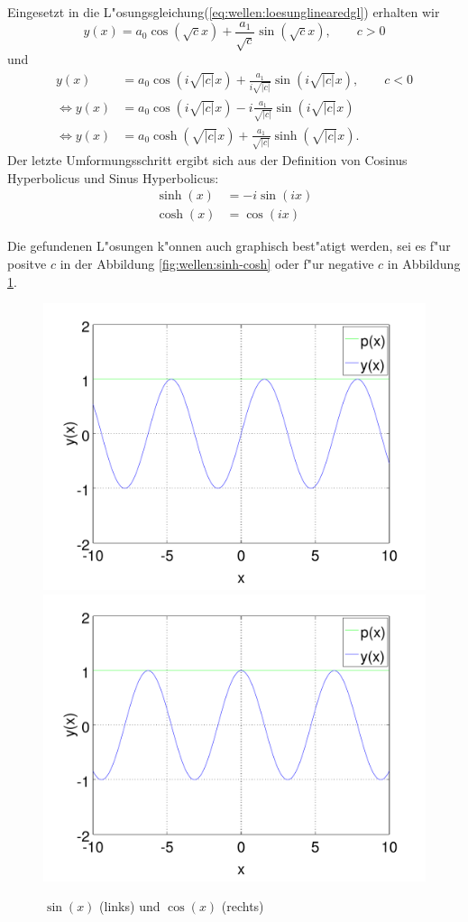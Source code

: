 Eingesetzt in die L"osungsgleichung(\ref{eq:wellen:loesunglinearedgl}) erhalten 
wir
\begin{equation*}
	y(x) = a_0 \cos(\sqrt{c}x) + \frac{a_1}{\sqrt{c}} \sin(\sqrt{c}x), \qquad c 
	> 0
\end{equation*}
und
\begin{equation}
	\begin{split}
		y(x) &= a_0 \cos(i\sqrt{|c|}x) + 
		\frac{a_1}{i\sqrt{|c|}}\sin(i\sqrt{|c|}x), \qquad c < 0\\
		\Leftrightarrow
		y(x) &= a_0 \cos(i\sqrt{|c|}x) - 
		i\frac{a_1}{\sqrt{|c|}}\sin(i\sqrt{|c|}x)\\
		\Leftrightarrow
		y(x) &= a_0 \cosh(\sqrt{|c|}x) + 
		\frac{a_1}{\sqrt{|c|}}\sinh(\sqrt{|c|}x).
	\end{split}	
\end{equation}
Der letzte Umformungsschritt ergibt sich aus der Definition von Cosinus 
Hyperbolicus und Sinus Hyperbolicus:
\begin{equation*}
	\begin{split}
		\sinh(x) &= -i \sin(ix)\\
		\cosh(x) &= \cos (ix)
	\end{split}
\end{equation*}

Die gefundenen L"osungen k"onnen auch graphisch best"atigt werden, sei es f"ur 
positve $c$ in der Abbildung \ref{fig:wellen:sinh-cosh} oder f"ur negative $c$ 
in Abbildung \ref{fig:wellen:sin-cos}.

\begin{figure}
	\includegraphics[width=0.51\hsize]{./wellen/images/basicfunctions/sin.pdf}
	\includegraphics[width=0.51\hsize]{./wellen/images/basicfunctions/cos.pdf}
	\caption{$\sin(x)$ (links) und $\cos(x)$ (rechts)}
	\label{fig:wellen:sin-cos}
\end{figure}


